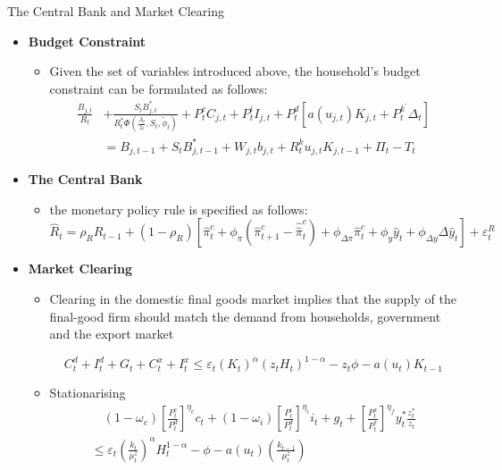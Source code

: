 \documentclass[9pt]{beamer}
\let\olditem\item
\renewcommand{\item}{%
\olditem\vspace{\fill}}
\begin{document}
\begin{frame}{The Central Bank and Market Clearing}
\begin{itemize}
    \item \textbf{Budget Constraint }
    \begin{itemize}
        \item  Given the set of variables introduced above, the household’s budget constraint can be formulated as follows:
$$
    \begin{aligned}
    \frac{B_{j, t}}{R_{t}} &+\frac{S_{t} B_{j, t}^{*}}{R_{t}^{*} \Phi\left(\frac{A_{t}}{z_{t}}, S_{t}, \tilde{\phi}_{t}\right)}+P_{t}^{c} C_{j, t}+P_{t}^{i} I_{j, t}+P_{t}^{d}\left[a\left(u_{j, t}\right) K_{j, t}+P_{t}^{k^{\prime}} \Delta_{t}\right] \\
    &=B_{j, t-1}+S_{t} B_{j, t-1}^{*}+W_{j, t} b_{j, t}+R_{t}^{k} u_{j, t} K_{j, t-1}+\Pi_{t}-T_{t}
    \end{aligned}
$$
        
        \end{itemize}        


    \item \textbf{The Central Bank}
    \begin{itemize}
        \item the monetary policy rule is specified as follows:
        $$\hat{R}_{t}=\rho_{R} \hat{R}_{t-1}+\left(1-\rho_{R}\right)\left[\hat{\pi}_{t}^{c}+\phi_{\pi}\left(\hat{\pi}_{t+1}^{c}-\hat{\hat{\pi}}_{t}^{c}\right)+\phi_{\Delta \pi} \hat{\pi}_{t}^{c}+\phi_{y} \hat{y}_{t}+\phi_{\Delta y} \Delta \hat{y}_{t}\right]+\varepsilon_{t}^{R} $$
    \end{itemize}
    \item \textbf{Market Clearing} 
    \begin{itemize}
        \item Clearing in the domestic final goods market implies that the supply of the final-good firm should match the demand from households, government and the export market
        
        $$C_{t}^{d}+I_{t}^{d}+G_{t}+C_{t}^{x}+I_{t}^{x} \leq \varepsilon_{t}\left(K_{t}\right)^{\alpha}\left(z_{t} H_{t}\right)^{1-\alpha}-z_{t} \phi-a\left(u_{t}\right) K_{t-1}$$
        
        \item Stationarising
        $$\begin{array}{l}
\quad\left(1-\omega_{c}\right)\left[\frac{P_{t}^{c}}{P_{t}^{d}}\right]^{\eta_{c}} c_{t}+\left(1-\omega_{i}\right)\left[\frac{P_{t}^{i}}{P_{t}^{d}}\right]^{\eta_{i}} i_{t}+g_{t}+\left[\frac{P_{t}^{x}}{P_{t}^{*}}\right]^{\eta_{f}} y_{t}^{*} \frac{z_{t}^{*}}{z_{t}} \\
\leq \varepsilon_{t}\left(\frac{k_{t}}{\mu_{t}^{z}}\right)^{\alpha} H_{t}^{1-\alpha}-\phi-a\left(u_{t}\right)\left(\frac{k_{t-1}}{\mu_{t}^{z}}\right)
\end{array}$$
        
    \end{itemize}
    
    
\end{itemize}

\end{frame}
\end{document}
